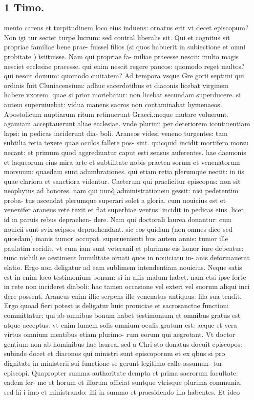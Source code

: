 \documentclass{article}
\begin{document}
\begin{pages}
\section*{1 Timo. }
\marginpar{[ p.205 ]}\pstart mento carens et turpitudinem loco eius induens: ornatus erit vt decet episcopum? Non igi tur sectet turpe lucrum: sed contral liberalis sit. Qui et cognitus sit propriae familiae bene prae- fuissel filios (si quos habuerit in subiectione et omni probitate ) ĩstituisse. Nam qui propriae fa- miliae praeesse nescit: multo magis nesciet ecclesiae praeesse. qui enim nescit regere paucos: quomodo reget multos? qui nescit domum: quomodo ciuitatem? Ad tempora vsque Gre gorii septimi qui ordinis fuit Cluniacensium: adhuc sacerdotibus et diaconis licebat virginem habere vxorem. quae si prior moriebatur: non licebat secundam superducere. si autem superuiuebat: vidua manens sacros non contaminabat hymenaeos. Apostolicum nuptiarum ritum retinuerunt Graeci.:neque mutare voluerunt. agamiam acceptauerunt aliae ecclesiae. vnde plurimi per deteriorem icontinentiam lapsi: in pedicas inciderunt dia- boli. Araneos videsi veneno turgentes: tam subtilia retia texere quae oculos fallere pos- sint. quicquid incidit mortifero morsu necant: et primum quod aggrediuntur caput esti sensus auferentes. hae daemonis et laqueorum eius mira arte et subtilitate nobis praeten sorum et venenatorum morsuum: quaedam sunt adumbrationes. qui etiam retia plerumque  nectit: in iis quae clariora et sanctiora videntur. Caeterum qui praeficitur episcopus: non sit neophytus ad honores. nam qui nunq̃ administrationem gessit: nisi pedetentim proba- tus ascendat plerumque superari solet a gloria. cum nouicius est et venenifer araneus rete texit et flat superbiae ventus: incidit in pedicas eius. licet id in paruis rebus depraehen- dere. Nam qui doctorali laurea donantur: cum nouicii sunt svix seipsos depraehendant. sic eos quidam (non omnes dico sed quosdam) inanis tumor occupat. superuenienti bus autem annis: tumor ille paulatim recidit, vt cum iam sunt veteranil et plurimus eis honor iure debeatur: tunc nichili se aestiment humilitate ornati quos in nouiciatu in- anis deformauerat elatio. Ergo non deligatur ad eam sublimem intendentiam nouicius. Neque satis est in enim loco testimonium bonum: si in aliis malum habet. nam etsi ipse forte in rete non incideret diaboli: hac tamen occasione vel exteri vel suorum aliqui inci dere possent. Araneus enim illic serpens ille venenatus antiquus: fila sua tendit. Ergo quoad fieri potest is deligatur huic prouiciae et sacrosanctae functioni committatur: qui ab omnibus bonum habet testimonium et omnibus gratus est atque acceptus. vt enim lumem solis omnium oculis gratum est: aeque et vera virtus omnium mentibus etiam plurimo- rum eorum qui aegrotant. Vt doctor gentium non ab hominibus hac laureal sed a Chri sto donatus docuit episcopos: subinde docet et diaconos qui ministri sunt episcoporum  et ex qbus si pro dignitate in ministerii sui functione se gerunt legitimo calle assumun- tur episcopi. Quapropter summa authoritate dempta et prima sacrorum facultate: eadem fer- me et horum et illorum officiat suntque vtrisque plurima communia. sed hi i imo et ministrando: illi in summo et praesidendo illa habentes. Et ideo 
\end{pages}
\end{document}
